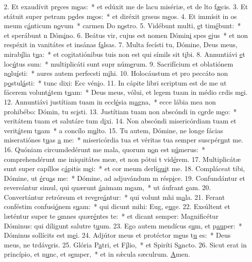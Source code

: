 2. Et exaudívit pr\uline{e}ces m\uline{e}as:~* et edúxit me de lacu misériæ, et de lto f\uline{æ}cis.
3. Et státuit super petram p\uline{e}des m\uline{e}os:~* et diréxit grssus m\uline{e}os.
4. Et immísit in os meum c\uline{á}nticum n\uline{o}vum~* carmen Do n\uline{o}stro.
5. Vidébunt multi, \uline{e}t tim\uline{é}bunt:~* et sperábunt n Dóm\uline{i}no.
6. Beátus vir, cujus est nomen Dómin\uline{i} spes \uline{e}jus~* et non respéxit in vanitátes et insánas f\uline{a}lsas.
7. Multa fecísti tu, Dómine, Deus meus, mirab\uline{í}lia t\uline{u}a:~* et cogitatiónibus tuis non est qui símils sit t\uline{i}bi.
8. Annuntiávi \uline{e}t loc\uline{ú}tus sum:~* multiplicáti sunt supr núm\uline{e}rum.
9. Sacrifícium et oblatiónem n\uline{o}lu\uline{í}sti:~* aures autem perfecsti m\uline{i}hi.
10. Holocáustum et pro peccáto non p\uline{o}stul\uline{á}sti:~* tunc dixi: Ecc vén\uline{i}o.
11. In cápite libri scriptum est de me ut fácerem volunt\uline{á}tem t\uline{u}am:~* Deus meus, vólui, et legem tuam in médio crdis m\uline{e}i.
12. Annuntiávi justítiam tuam in eccl\uline{é}sia m\uline{a}gna,~* ecce lábia mea non prohibébo: Dómin, tu sc\uline{i}sti.
13. Justítiam tuam non abscóndi in c\uline{o}rde m\uline{e}o:~* veritátem tuam et salutáre tum d\uline{i}xi.
14. Non abscóndi misericórdiam tuam et verit\uline{á}tem t\uline{u}am~* a concílo m\uline{u}lto.
15. Tu autem, Dómine, ne longe fácias miseratiónes t\uline{u}as \uline{a} me:~* misericórdia tua et véritas tua semper suscpér\uline{u}nt me.
16. Quóniam circumdedérunt me mala, quorum n\uline{o}n est n\uline{ú}merus:~* comprehendérunt me iniquitátes meæ, et non pótui t vid\uline{é}rem.
17. Multiplicátæ sunt super capíllos c\uline{á}pitis m\uline{e}i:~* et cor meum derlí\uline{qui}t me.
18. Compláceat tibi, Dómine, ut \uline{é}ru\uline{a}s me:~* Dómine, ad adjuvándum m résp\uline{i}ce.
19. Confundántur et revereántur simul, qui quærunt \uline{á}nimam m\uline{e}am,~* ut áufrant \uline{e}am.
20. Convertántur retrórsum et rev\uline{e}re\uline{á}ntur:~* qui volunt mhi m\uline{a}la.
21. Ferant conféstim confusi\uline{ó}nem s\uline{u}am:~* qui dicunt mihi: Eug, e\uline{u}ge.
22. Exsúltent et læténtur super te \uline{o}mnes quær\uline{é}ntes te:~* et dicant semper: Magnificétur Dóminus: qui díligunt salutre t\uline{u}um.
23. Ego autem mendícus s\uline{u}m, et p\uline{au}per:~* Dóminus sollícits est m\uline{e}i.
24. Adjútor meus et protéctor m\uline{e}us t\uline{u} es:~* Deus meus, ne trdáv\uline{e}ris.
25. Glória P\uline{a}tri, et F\uline{í}lio,~* et Spiríti S\uline{a}ncto.
26. Sicut erat in princípio, et n\uline{u}nc, et s\uline{e}mper,~* et in sǽcula sæculrum. \uline{A}men.
